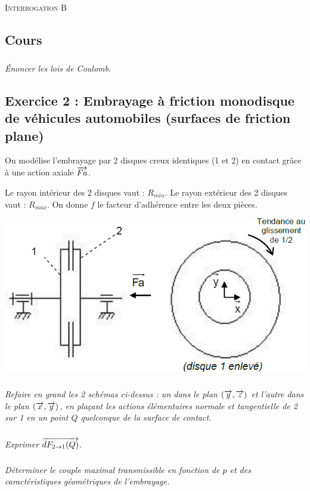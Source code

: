 \documentclass[10pt]{article}
\begin{document}

\begin{center}
\Large{\textsc{Interrogation B}}
\end{center}

\subsection*{Cours}
\subparagraph*{}
\textit{Énoncer les lois de Coulomb.}



\subsection*{Exercice 2 : Embrayage à friction monodisque de véhicules automobiles (surfaces de friction plane)}
\setcounter{subparagraph}{0} 

\begin{minipage}[c]{.55\linewidth}
On modélise l'embrayage par 2 disques creux identiques (1 et 2) en contact grâce à une 
action axiale $\overrightarrow{Fa}$. 
 
Le rayon intérieur des 2 disques vaut : $R_{min}$. 
Le rayon extérieur des 2 disques vaut : $R_{max}$. 
On donne $f$ le facteur d’adhérence entre les deux pièces. 



\end{minipage}\hfill
\begin{minipage}[c]{.4\linewidth}
\begin{center}
\includegraphics[width=.9\textwidth]{images/fig_07}
\end{center}
\end{minipage}

\subparagraph{}
\textit{Refaire en grand les 2 schémas ci-dessus : un dans le plan $(\overrightarrow{y}, \overrightarrow{z})$ et l’autre dans le plan $(\overrightarrow{x}, \overrightarrow{y})$, en plaçant les actions élémentaires normale et tangentielle de 2 sur 1 en un point $Q$ quelconque de la surface de contact.}

\subparagraph{}
\textit{Exprimer $\overrightarrow{dF_{2\rightarrow 1}(Q)}$.}

\subparagraph{}
\textit{Déterminer le couple maximal transmissible en fonction de $p$ et des caractéristiques 
géométriques de l’embrayage.}
\end{document}
